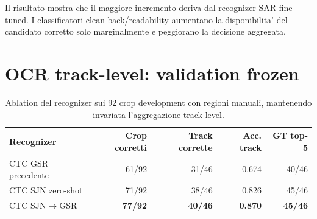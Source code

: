 \documentclass[11pt,a4paper]{article}
\begin{document}
\begin{table}[htbp]
  \centering
  \caption{Ablation 3$\times$2 sulle nove sequenze di development. ``GT top-5''
  conta le tracklet in cui almeno un crop produce il numero ground truth.}
  \label{tab:ocr-internal}
\end{table}

Il risultato mostra che il maggiore incremento deriva dal recognizer SAR
fine-tuned. I classificatori clean-back/readability aumentano la disponibilita'
del candidato corretto solo marginalmente e peggiorano la decisione aggregata.

\section{OCR track-level: validation frozen}

\begin{table}[htbp]
  \centering
  \caption{Ablation del recognizer sui 92 crop development con regioni
  manuali, mantenendo invariata l'aggregazione track-level.}
  \label{tab:ctc-transfer-development}
  \begin{tabular}{lrrrr}
    \toprule
    Recognizer & Crop corretti & Track corrette & Acc. track & GT top-5 \\
    \midrule
    CTC GSR precedente & 61/92 & 31/46 & 0.674 & 40/46 \\
    CTC SJN zero-shot & 71/92 & 38/46 & 0.826 & 45/46 \\
    CTC SJN$\rightarrow$GSR & \textbf{77/92} & \textbf{40/46} & \textbf{0.870} & \textbf{45/46} \\
    \bottomrule
  \end{tabular}
\end{table}
\end{document}
